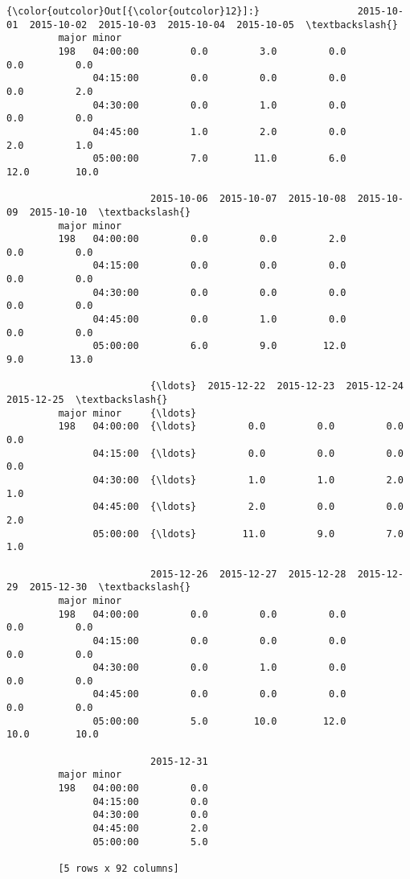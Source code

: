 \documentclass[11pt]{article}
\begin{document}
\begin{Verbatim}[commandchars=\\\{\}]
{\color{outcolor}Out[{\color{outcolor}12}]:}                 2015-10-01  2015-10-02  2015-10-03  2015-10-04  2015-10-05  \textbackslash{}
         major minor                                                                  
         198   04:00:00         0.0         3.0         0.0         0.0         0.0   
               04:15:00         0.0         0.0         0.0         0.0         2.0   
               04:30:00         0.0         1.0         0.0         0.0         0.0   
               04:45:00         1.0         2.0         0.0         2.0         1.0   
               05:00:00         7.0        11.0         6.0        12.0        10.0   
         
                         2015-10-06  2015-10-07  2015-10-08  2015-10-09  2015-10-10  \textbackslash{}
         major minor                                                                  
         198   04:00:00         0.0         0.0         2.0         0.0         0.0   
               04:15:00         0.0         0.0         0.0         0.0         0.0   
               04:30:00         0.0         0.0         0.0         0.0         0.0   
               04:45:00         0.0         1.0         0.0         0.0         0.0   
               05:00:00         6.0         9.0        12.0         9.0        13.0   
         
                         {\ldots}  2015-12-22  2015-12-23  2015-12-24  2015-12-25  \textbackslash{}
         major minor     {\ldots}                                                   
         198   04:00:00  {\ldots}         0.0         0.0         0.0         0.0   
               04:15:00  {\ldots}         0.0         0.0         0.0         0.0   
               04:30:00  {\ldots}         1.0         1.0         2.0         1.0   
               04:45:00  {\ldots}         2.0         0.0         0.0         2.0   
               05:00:00  {\ldots}        11.0         9.0         7.0         1.0   
         
                         2015-12-26  2015-12-27  2015-12-28  2015-12-29  2015-12-30  \textbackslash{}
         major minor                                                                  
         198   04:00:00         0.0         0.0         0.0         0.0         0.0   
               04:15:00         0.0         0.0         0.0         0.0         0.0   
               04:30:00         0.0         1.0         0.0         0.0         0.0   
               04:45:00         0.0         0.0         0.0         0.0         0.0   
               05:00:00         5.0        10.0        12.0        10.0        10.0   
         
                         2015-12-31  
         major minor                 
         198   04:00:00         0.0  
               04:15:00         0.0  
               04:30:00         0.0  
               04:45:00         2.0  
               05:00:00         5.0  
         
         [5 rows x 92 columns]
\end{Verbatim}
            
\end{document}
